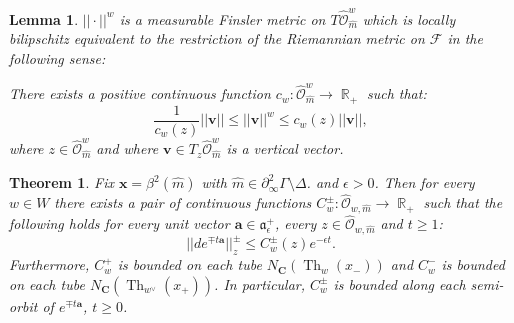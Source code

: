 \documentclass[10pt,a4paper]{amsart}
\newtheorem{lem}{Lemma}
\newtheorem{thm}{Theorem}
\def\CC{{\mathbf{C}}}
\def\Ga{\Gamma}
\DeclareMathOperator{\R}{\mathbb{R}}
\DeclareMathOperator{\Th}{Th}
\def\ba{\mathbf{a}}
\def\bv{\mathbf{v}}
\def\bx{\mathbf{x}}
\def\cF{{\mathscr{F}}}
\def\cO{{\mathscr{O}}}
\def\eps{\epsilon}
\begin{document}
\begin{lem}\label{lem:comparison}
$||\cdot||^w$ is a measurable Finsler metric on $T\hat{\cO}_{\hat{m}}^w$ which 
is locally bilipschitz equivalent to the restriction of the Riemannian metric on $\cF$ in the following sense:  

There exists a positive continuous function $c_w: \hat{\cO}_{\hat{m}}^w\to \R_+$  such that:
 $$
\frac{1}{c_w(z)}||\bv|| \leqslant ||\bv||^w\leqslant c_w(z)||\bv||, 
$$
where  $z\in \hat{\cO}_{\hat{m}}^w$ and where $\bv\in T_z\hat{\cO}_{\hat{m}}^w$ is a vertical vector.  
\end{lem}

\begin{thm}\label{thm:transvection contraction} 
Fix $\bx = \beta^2(\hat{m})$ with $\hat{m} \in \partial_\infty^2 \Ga \setminus \Delta$. 
and  $\eps>0$. Then for every $w\in W$ there exists a pair of continuous functions $C_w^\pm: \hat{\cO}_{w,\hat{m}}\to \R_+$ 
such that the following holds for every unit vector $\ba\in \mathfrak{a}^+_{\eps}$, every $z\in \hat{\cO}_{w,\hat{m}}$ and $t\geqslant 1$: 
$$
||de^{\mp t\ba}||_z^\pm \leqslant C_w^\pm(z) e^{-\eps t}.  
$$
Furthermore, $C_w^+$ is bounded on each tube $N_{\CC}(\Th_w(x_-))$ and $C_w^-$ is bounded on each tube $N_{\CC}(\Th_{w^\vee}(x_+))$. In particular, 
$C_w^\pm$ is bounded along each semi-orbit of $e^{\mp t\ba}$, $t\geqslant 0$. 
\end{thm}
\end{document}

